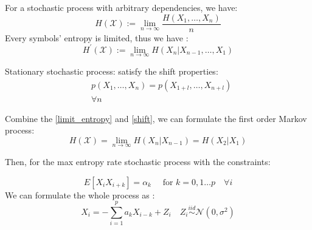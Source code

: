 \documentclass[12pt, a4paper]{article}
\begin{document}
For a stochastic process with arbitrary dependencies, we have: 
\begin{equation}
	H(\mathcal{X}):=\lim _{n \rightarrow \infty} \frac{H\left(X_{1}, \ldots, X_{n}\right)}{n}
\end{equation}
Every symbols' entropy is limited, thus we have :  
\begin{equation}
	H^{\prime}(\mathcal{X}):=\lim _{n \rightarrow \infty} H\left(X_{n} | X_{n-1}, \ldots, X_{1}\right)
\end{equation}\label{limit_entropy}

Stationary stochastic process: satisfy the shift properties:  
\begin{equation}
	\begin{aligned}
	&p\left(X_{1}, \ldots, X_{n}\right)=p\left(X_{1+l}, \ldots, X_{n+l}\right)\\
	&\forall n 
\end{aligned}
\end{equation}\label{shift}

Combine the \ref{limit_entropy} and \ref{shift}, we can formulate the first order Markov process:
\begin{equation}
	H(\mathcal{X})=\lim _{n \rightarrow \infty} H\left(X_{n} | X_{n-1}\right)=H\left(X_{2} | X_{1}\right)
\end{equation}


Then, for the max entropy rate stochastic process with the constraints:

\begin{equation}
	E\left[X_{i} X_{i+k}\right]=\alpha_{k} \quad \text { for } k=0,1 \ldots p \quad \forall i
\end{equation}
We can formulate the whole process as :  
\begin{equation}
	X_{i}=-\sum_{i=1}^{p} a_{k} X_{i-k}+Z_{i} \quad Z_{i} \stackrel{i i d}{\sim} \mathcal{N}\left(0, \sigma^{2}\right)
\end{equation}
\end{document}
